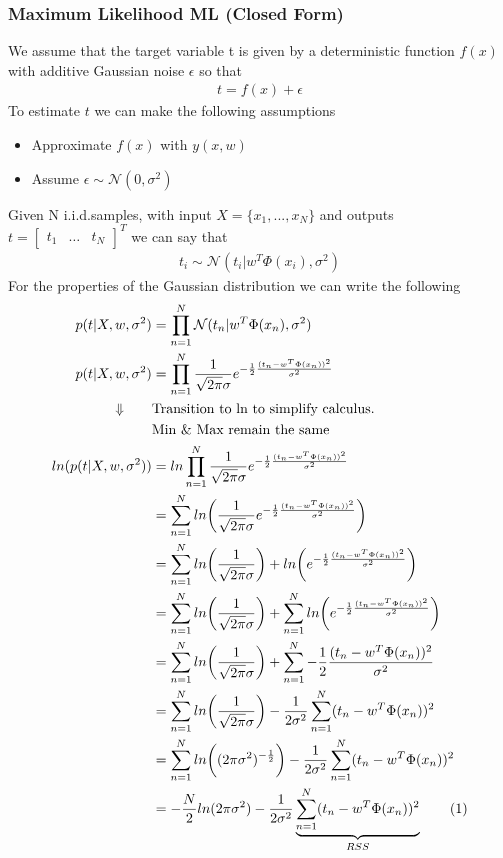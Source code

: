 \documentclass[main.tex]{subfiles}
\newcommand\numberthis{\addtocounter{equation}{1}\tag{\theequation}}
\begin{document}
\subsubsection{Maximum Likelihood ML (Closed Form)}
We assume that the target variable t is given by a deterministic function
$f(x)$ with additive Gaussian noise $\epsilon$ so that
\begin{align*}
    t=f(x)+\epsilon
\end{align*}
To estimate $t$ we can make the following assumptions
\begin{itemize}
    \item Approximate $f(x)$ with $y(x,w)$
    \item Assume $\epsilon\sim\mathcal{N}(0, \sigma^2)$
\end{itemize}
Given N i.i.d.\footnotemark samples, with input $X=\{x_1,...,x_N\}$ and outputs $t=\begin{bmatrix} t_1 & \dots & t_N\end{bmatrix}^T$ we can say that
\begin{align}
    t_i\sim \mathcal{N}(t_i|w^T\Phi(x_i),\sigma^2)
\end{align}
For the properties of the Gaussian distribution we can write the following
\begin{align*}
    p(t|X,w,\sigma^2)&=\prod_{n=1}^N \mathcal{N}(t_n|w^T\Phi(x_n),\sigma^2)\\
    p(t|X,w,\sigma^2)&=\prod_{n=1}^N\frac{1}{\sqrt{2\pi}\sigma}e^{-\frac{1}{2}\frac{(t_n-w^T\Phi(x_n))^2}{\sigma^2}}\\
    \Downarrow \quad \quad & \text{Transition to ln to simplify calculus.} \\
    & \text{Min \& Max remain the same}\\
    ln(p(t|X,w,\sigma^2))&=ln\prod_{n=1}^N\frac{1}{\sqrt{2\pi}\sigma}e^{-\frac{1}{2}\frac{(t_n-w^T\Phi(x_n))^2}{\sigma^2}}\\
    &=\sum_{n=1}^Nln\bigg( \frac{1}{\sqrt{2\pi}\sigma}e^{-\frac{1}{2}\frac{(t_n-w^T\Phi(x_n))^2}{\sigma^2}} \bigg)\\
    &=\sum_{n=1}^Nln\bigg(\frac{1}{\sqrt{2\pi}\sigma}\bigg) + ln\bigg(e^{-\frac{1}{2}\frac{(t_n-w^T\Phi(x_n))^2}{\sigma^2}}\bigg)\\
    &=\sum_{n=1}^Nln\bigg(\frac{1}{\sqrt{2\pi}\sigma}\bigg) + \sum_{n=1}^N ln\bigg(e^{-\frac{1}{2}\frac{(t_n-w^T\Phi(x_n))^2}{\sigma^2}}\bigg)\\
    &=\sum_{n=1}^Nln\bigg(\frac{1}{\sqrt{2\pi}\sigma}\bigg) + \sum_{n=1}^N -\frac{1}{2}\frac{(t_n-w^T\Phi(x_n))^2}{\sigma^2}\\
    &=\sum_{n=1}^Nln\bigg(\frac{1}{\sqrt{2\pi}\sigma}\bigg) -\frac{1}{2\sigma^2} \sum_{n=1}^N(t_n-w^T\Phi(x_n))^2\\
    &=\sum_{n=1}^Nln\bigg((2\pi\sigma^2)^{-\frac{1}{2}}\bigg) -\frac{1}{2\sigma^2} \sum_{n=1}^N(t_n-w^T\Phi(x_n))^2\\
    &=-\frac{N}{2}ln(2\pi\sigma^2) -\frac{1}{2\sigma^2} \underbrace{\sum_{n=1}^N(t_n-w^T\Phi(x_n))^2}_{RSS} \numberthis
\end{align*}
\end{document}
